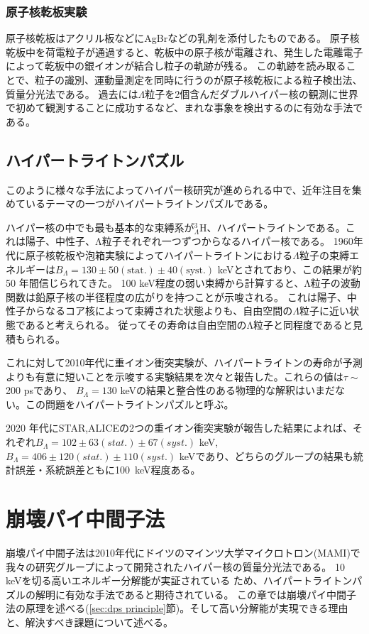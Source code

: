 \documentclass[a4paper,11pt,uplatex]{jsbook}
\begin{document}
\subsubsection{原子核乾板実験}
原子核乾板はアクリル板などにAgBrなどの乳剤を添付したものである。
原子核乾板中を荷電粒子が通過すると、乾板中の原子核が電離され、発生した電離電子によって乾板中の銀イオンが結合し粒子の軌跡が残る。
この軌跡を読み取ることで、粒子の識別、運動量測定を同時に行うのが原子核乾板による粒子検出法、質量分光法である。
過去には$\Lambda$粒子を2個含んだダブルハイパー核の観測に世界で初めて観測することに成功するなど\cite{takahashi2001}、まれな事象を検出するのに有効な手法である。

\subsection{ハイパートライトンパズル}\label{sec:hypertriton puzzle}
このように様々な手法によってハイパー核研究が進められる中で、近年注目を集めているテーマの一つがハイパートライトンパズルである。

ハイパー核の中でも最も基本的な束縛系が$^3_{\Lambda}\text{H}$、ハイパートライトンである。これは陽子、中性子、Λ粒子それぞれ一つずつからなるハイパー核である。
1960年代に原子核乾板や泡箱実験によってハイパートライトンにおける$\Lambda$粒子の束縛エネルギーは$B_{\Lambda} = 130 \pm 50(\text{stat.}) \pm 40(\text{syst.})$ keVとされており\cite{Juric}、この結果が約50 年間信じられてきた。
100 keV程度の弱い束縛から計算すると、Λ粒子の波動関数は鉛原子核の半径程度の広がりを持つことが示唆される。
これは陽子、中性子からなるコア核によって束縛された状態よりも、自由空間の$\Lambda$粒子に近い状態であると考えられる。%
従ってその寿命は自由空間のΛ粒子と同程度であると見積もられる。

これに対して2010年代に重イオン衝突実験が、ハイパートライトンの寿命が予測よりも有意に短いことを示唆する実験結果を次々と報告した\cite{HI-1,HI-2,HI-3,HI-4}。これらの値は$\tau \sim$200 psであり、
$B_{\Lambda} = 130$ keVの結果と整合性のある物理的な解釈はいまだない。この問題をハイパートライトンパズルと呼ぶ。

2020 年代にSTAR,ALICEの2つの重イオン衝突実験が報告した結果によれば、それぞれ$B_{\Lambda}= 102 \pm 63(stat.) \pm 67(syst.)$ keV\cite{STAR}, 
$B_{\Lambda} = 406 \pm 120(stat.) \pm 110 (syst.)$ keV\cite{ALICE}であり、どちらのグループの結果も統計誤差・系統誤差ともに100~keV程度ある。\\

\section{崩壊パイ中間子法}\label{DPS}
崩壊パイ中間子法は2010年代にドイツのマインツ大学マイクロトロン(MAMI)で我々の研究グループによって開発されたハイパー核の質量分光法である\cite{esserObservation4Hyperhydrogen2015}。
10 keVを切る高いエネルギー分解能が実証されている\cite{Schulz2015} ため、ハイパートライトンパズルの解明に有効な手法であると期待されている。
この章では崩壊パイ中間子法の原理を述べる(\ref{sec:dps principle}節)。そして高い分解能が実現できる理由と、解決すべき課題について述べる。
\end{document}
